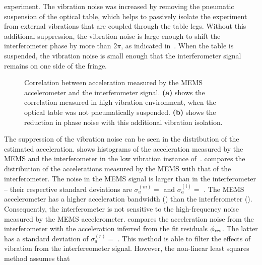 experiment. The vibration noise was increased
by removing the pneumatic suspension of the optical table, which
helps to passively isolate the experiment from external vibrations
that are coupled through the table legs. Without this additional
suppression, the vibration noise is large enough to shift the
interferometer phase by more than \(2\pi\), as indicated
in~. When the table is suspended, the
vibration noise is small enough that the interferometer signal remains
on one side of the fringe.
\begin{figure}[htpb!]
  \centering
  \caption[Comparison of MEMS/Interferometer correlation in a high and
    low vibration
  environments.]{Correlation between acceleration measured by the MEMS
    accelerometer and the interferometer signal. \textbf{(a)} shows
    the correlation measured in high vibration environment, when the
    optical table was not pneumatically suspended. \textbf{(b)} shows
    the reduction in phase noise with this additional vibration
  isolation.}
  \label{fig:vib_comparison}
\end{figure}
\par\noindent
The suppression of the vibration noise can be seen in the distribution
of the estimated acceleration.  shows
histograms of the acceleration measured by the MEMS and the
interferometer in the low vibration instance
of~.  compares the distribution of
the accelerations measured by the MEMS with that of the
interferometer. The noise in the MEMS signal is larger than in the
interferometer -- their respective standard deviations are
$\sigma_a^{(m)} =$  and
$\sigma_a^{(i)} =$ . The MEMS
accelerometer has a higher acceleration bandwidth () than the
interferometer (). Consequently, the interferometer
is not sensitive to the high-frequency noise measured by the MEMS
accelerometer.  compares the acceleration noise
from the interferometer with the acceleration inferred from the fit
residuals
$\phi_\textnormal{res}$. The latter has a standard deviation of
$\sigma_a^{(r)} = $ . This method is
able to filter the effects of vibration from the interfereometer
signal. However, the non-linear least squares method assumes that
